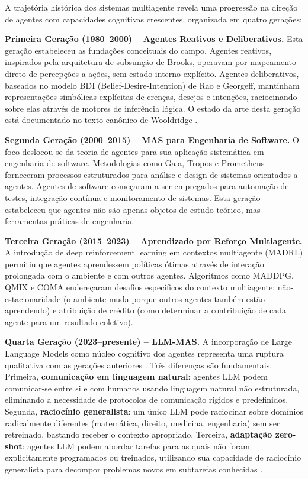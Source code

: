 \documentclass[12pt,a4paper,sumario=tradicional,openany]{abntex2}
\begin{document}
A trajetória histórica dos sistemas multiagente revela uma progressão na direção de agentes com capacidades cognitivas crescentes, organizada em quatro gerações:

\textbf{Primeira Geração (1980--2000) -- Agentes Reativos e Deliberativos.} Esta geração estabeleceu as fundações conceituais do campo. Agentes reativos, inspirados pela arquitetura de subsunção de Brooks, operavam por mapeamento direto de percepções a ações, sem estado interno explícito. Agentes deliberativos, baseados no modelo BDI (Belief-Desire-Intention) de Rao e Georgeff, mantinham representações simbólicas explícitas de crenças, desejos e intenções, raciocinando sobre elas através de motores de inferência lógica. O estado da arte desta geração está documentado no texto canônico de Wooldridge \cite{wooldridge2009mas}.

\textbf{Segunda Geração (2000--2015) -- MAS para Engenharia de Software.} O foco deslocou-se da teoria de agentes para sua aplicação sistemática em engenharia de software. Metodologias como Gaia, Tropos e Prometheus forneceram processos estruturados para análise e design de sistemas orientados a agentes. Agentes de software começaram a ser empregados para automação de testes, integração contínua e monitoramento de sistemas. Esta geração estabeleceu que agentes não são apenas objetos de estudo teórico, mas ferramentas práticas de engenharia.

\textbf{Terceira Geração (2015--2023) -- Aprendizado por Reforço Multiagente.} A introdução de deep reinforcement learning em contextos multiagente (MADRL) permitiu que agentes aprendessem políticas ótimas através de interação prolongada com o ambiente e com outros agentes. Algoritmos como MADDPG, QMIX e COMA endereçaram desafios específicos do contexto multiagente: não-estacionaridade (o ambiente muda porque outros agentes também estão aprendendo) e atribuição de crédito (como determinar a contribuição de cada agente para um resultado coletivo).

\textbf{Quarta Geração (2023--presente) -- LLM-MAS.} A incorporação de Large Language Models como núcleo cognitivo dos agentes representa uma ruptura qualitativa com as gerações anteriores \cite{rasheed2026llm}. Três diferenças são fundamentais. Primeira, \textbf{comunicação em linguagem natural}: agentes LLM podem comunicar-se entre si e com humanos usando linguagem natural não estruturada, eliminando a necessidade de protocolos de comunicação rígidos e predefinidos. Segunda, \textbf{raciocínio generalista}: um único LLM pode raciocinar sobre domínios radicalmente diferentes (matemática, direito, medicina, engenharia) sem ser retreinado, bastando receber o contexto apropriado. Terceira, \textbf{adaptação zero-shot}: agentes LLM podem abordar tarefas para as quais não foram explicitamente programados ou treinados, utilizando sua capacidade de raciocínio generalista para decompor problemas novos em subtarefas conhecidas \cite{miranda2026bridging}.
\end{document}
